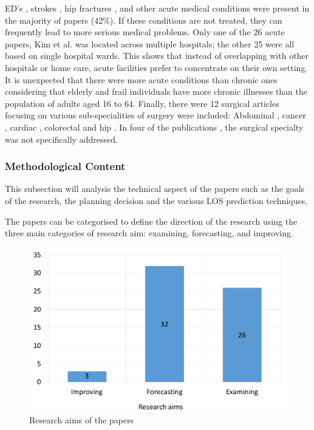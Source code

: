 \documentclass[../thesis.tex]{subfiles}
\begin{document}
ED's \cite{Bahrmann2018}, strokes \cite{Sommerfeld2011}, hip fractures \cite{Rajamaki2020}, and other acute medical conditions were present in the majority of papers (42\%). If these conditions are not treated, they can frequently lead to more serious medical problems. Only one of the 26 acute papers, Kim et al. \cite{Kim2018} was located across multiple hospitals; the other 25 were all based on single hospital wards. This shows that instead of overlapping with other hospitals or home care, acute facilities prefer to concentrate on their own setting. It is unexpected that there were more acute conditions than chronic ones considering that elderly and frail individuals have more chronic illnesses than the population of adults aged 16 to 64. Finally, there were 12 surgical articles focusing on various sub-specialities of surgery were included: Abdominal \cite{Marano2022}, cancer \cite{Raab2022}, cardiac \cite{Cacciatore2012,Kirfel2021,Pustavoitau2016}, colorectal \cite{AgasiIdenburg2019} and hip \cite{Justo2011,Willems2012}. In four of the publications \cite{Harvey2020,Jones2021, Zattoni2018, Zhao2020}, the surgical specialty was not specifically addressed.

\subsubsection{Methodological Content}
This subsection will analysis the technical aspect of the papers such as the goals of the research, the planning decision and the various LOS prediction techniques.

The papers can be categorised to define the direction of the research using the three main categories of research aim: examining, forecasting, and improving.

\begin{figure}[h!]
    \centering
    \includegraphics[scale=0.5]{Chapters/Chapter2/Figures2/aim1.pdf}
    \caption{Research aims of the papers}
    \label{fig:litreview2-aims}
\end{figure}
\end{document}
